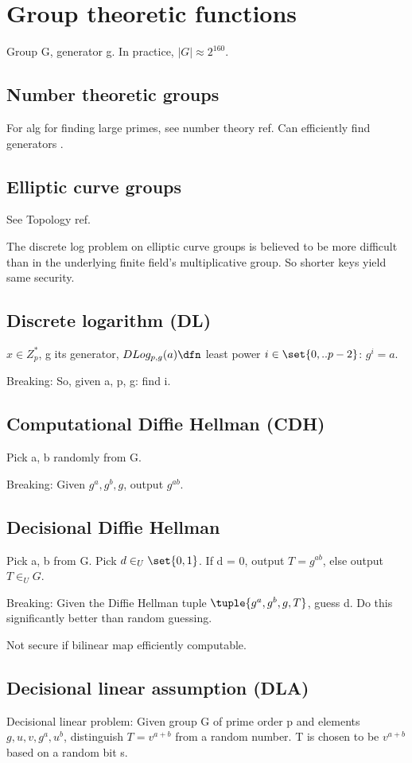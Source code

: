 \documentclass[oneside, article]{memoir}
\begin{document}
\section{Group theoretic functions}
Group G, generator g. In practice, $|G| \approx 2^{160}$.

\subsection{Number theoretic groups}
For alg for finding large primes, see number theory ref. Can efficiently find generators \why.

\subsection{Elliptic curve groups}
See Topology ref.

The discrete log problem on elliptic curve groups is believed to be more difficult than in the underlying finite field's multiplicative group. So shorter keys yield same security.

\subsection{Discrete logarithm (DL)}
$x \in Z_{p}^{*}$, g its  generator, $DLog_{p,g}(a) \dfn$ least power $i \in \set{0, .. p-2}$: $g^{i} = a$.

Breaking: So, given a, p, g: find i.

\subsection{Computational Diffie Hellman (CDH)}
Pick a, b randomly from G.

Breaking: Given $g^{a}, g^{b}, g$, output $g^{ab}$.

\subsection{Decisional Diffie Hellman}
Pick a, b from G. Pick $d \in_{U} \set{0, 1}$. If d = 0, output $T = g^{ab}$, else output $T \in_{U} G$.

Breaking: Given the Diffie Hellman tuple $\tuple{g^{a}, g^{b}, g, T}$, guess d. Do this significantly better than random guessing.

Not secure if bilinear map efficiently computable.

\subsection{Decisional linear assumption (DLA)}
Decisional linear problem: Given group G of prime order p and elements\\ $g, u, v, g^{a}, u^{b}$, distinguish $T = v^{a+b}$ from a random number. T is chosen to be $v^{a+b}$ based on a random bit s.
\end{document}
